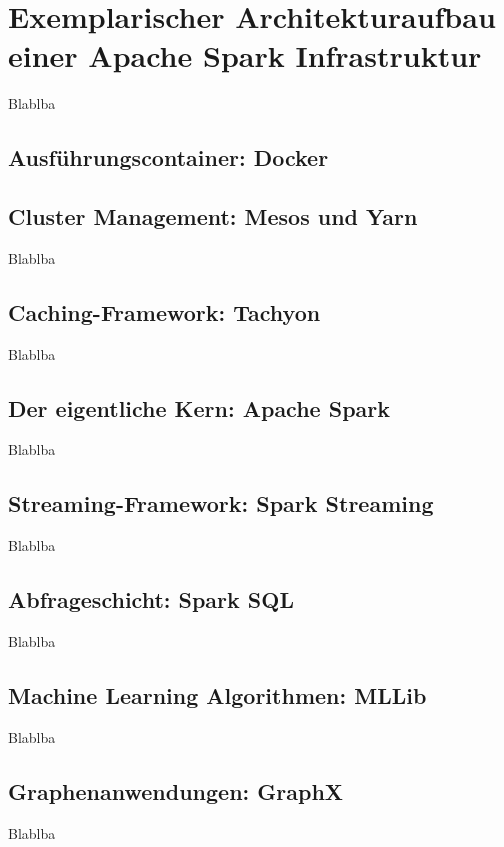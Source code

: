 \chapter{Exemplarischer Architekturaufbau einer Apache Spark Infrastruktur }
\label{chapter:architektur}



Blablba

\section{Ausführungscontainer: Docker}
\label{section:docker}

\section{Cluster Management: Mesos und Yarn }
\label{section:mesos}

Blablba

\section{Caching-Framework: Tachyon}
\label{section:tachyon}

Blablba

\section{Der eigentliche Kern: Apache Spark}
\label{section:kern}

Blablba

\section{Streaming-Framework: Spark Streaming}
\label{section:streaming}

Blablba

\section{Abfrageschicht: Spark SQL}
\label{section:spark sql}

Blablba

\section{Machine Learning Algorithmen: MLLib}
\label{section:mllib arch}

Blablba



\section{Graphenanwendungen: GraphX}
\label{section:graphx}

Blablba

